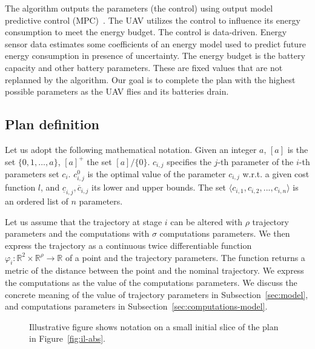 \documentclass[letterpaper,10pt,conference]{ieeeconf}
\newcommand{\figpath}{./figures}
\theoremstyle{definition}
\begin{document}
The algorithm outputs the parameters (the control) using output model predictive control (MPC)~\cite{rawlings2017model}. The UAV utilizes the control to influence its energy consumption to meet the energy budget. The control is data-driven. Energy sensor data estimates some coefficients of an energy model used to predict future energy consumption in presence of uncertainty. The energy budget is the battery capacity and other battery parameters. These are fixed values that are not replanned by the algorithm. Our goal is to complete the plan with the highest possible parameters as the UAV flies and its batteries drain. 

\subsection{Plan definition}
\label{sec:prelim}

Let us adopt the following mathematical notation. Given an integer $a$, $[a]$ is the set $\{0,1,\dots,a\}$, $[a]^+$ the set $[a]/\{0\}$. $c_{i,j}$ specifies the $j$-th parameter of the $i$-th parameters set $c_i$. $c_{i,j}^0$ is the optimal value of the parameter $c_{i,j}$ w.r.t. a given cost function $l$, and $\underline{c}_{i,j},\overline{c}_{i,j}$ its lower and upper bounds. The set $\langle c_{i,1},c_{i,2},...,c_{i,n}\rangle$ is an ordered list of $n$ parameters.

Let us assume that the trajectory at stage $i$ can be altered with $\rho$ trajectory parameters and the computations with $\sigma$ computations parameters. We then express the trajectory as a continuous twice differentiable function $\varphi_i:\mathbb{R}^2\times\mathbb{R}^\rho\rightarrow\mathbb{R}$ of a point and the trajectory parameters. The function returns a metric of the distance between the point and the nominal trajectory. We express the computations as the value of the computations parameters. We discuss the concrete meaning of the value of trajectory parameters in Subsection~\ref{sec:model}, and computations parameters in Subsection~\ref{sec:computations-model}.

\begin{figure}[h]
  \centering
  
  \caption{Illustrative figure shows notation on a small initial slice of the plan in Figure~\ref{fig:il-abs}.}
  \label{fig:traj1}
\end{figure}
\end{document}
